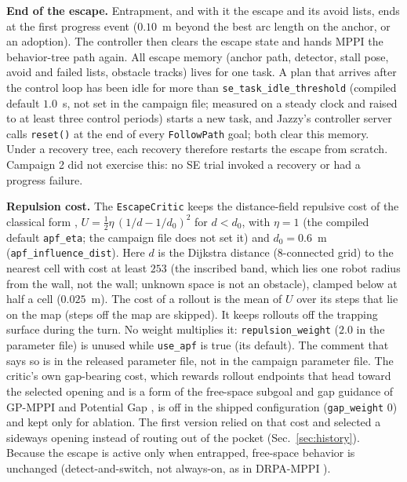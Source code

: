 \documentclass[journal]{IEEEtran}
\begin{document}
\textbf{End of the escape.} Entrapment, and with it the escape and its avoid lists, ends at
the first progress event ($0.10$~m beyond the best arc length on the anchor, or an adoption).
The controller then clears the escape state and hands MPPI the behavior-tree path again.
All escape memory (anchor path, detector, stall pose, avoid and failed lists, obstacle tracks)
lives for one task. A plan that arrives after the control loop has been idle for more than
\texttt{se\_task\_idle\_threshold} (compiled default $1.0$~s, not set in the campaign file; measured
on a steady clock and raised to at least three control periods)
starts a new task, and Jazzy's controller server calls \texttt{reset()} at the end of every
\texttt{FollowPath} goal; both clear this memory. Under a recovery tree, each recovery
therefore restarts the escape from scratch. Campaign 2 did not exercise this: no SE trial
invoked a recovery or had a progress failure.

\textbf{Repulsion cost.} The \texttt{EscapeCritic} keeps the distance-field repulsive cost of
the classical form \cite{khatib_apf},
$U=\tfrac12\eta\,(1/d - 1/d_0)^2$ for $d<d_0$, with $\eta=1$ (the compiled default
\texttt{apf\_eta}; the campaign file does not set it) and $d_0=0.6$~m
(\texttt{apf\_influence\_dist}). Here $d$ is the Dijkstra distance (8-connected grid) to the
nearest cell with cost at least $253$ (the inscribed band, which lies one robot radius from the
wall, not the wall; unknown space is not an obstacle), clamped below at half a cell
($0.025$~m). The cost of a rollout is the mean of $U$ over its steps that lie on the map
(steps off the map are skipped). It keeps rollouts off the trapping surface during the turn.
No weight multiplies it: \texttt{repulsion\_weight} ($2.0$ in the parameter file) is unused
while \texttt{use\_apf} is true (its default). The comment that says so is in the released parameter file, not in the
campaign parameter file. The critic's own
gap-bearing cost, which rewards rollout endpoints that head toward the
selected opening and is a form of the free-space subgoal and gap guidance of
GP-MPPI \cite{gp_mppi} and Potential Gap \cite{potential_gap}, is off in the shipped
configuration (\texttt{gap\_weight} $0$) and kept only for ablation. The first version
relied on that cost and selected a sideways opening instead of routing out of the pocket
(Sec.~\ref{sec:history}). Because the escape is active only when entrapped,
free-space behavior is unchanged (detect-and-switch, not always-on, as in DRPA-MPPI
\cite{drpa_mppi}).
\end{document}
